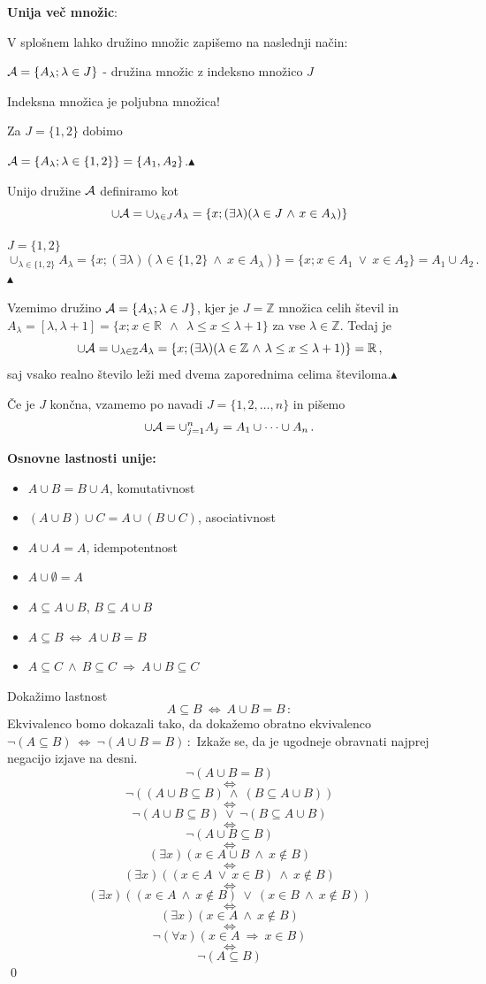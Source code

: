 \documentclass[12pt,a4paper]{article}
\def\ali {{~\vee~}}
\def\inn {{~\wedge~}}
\def\sledi {{~\Rightarrow~}}
\def\cee {{~\Leftrightarrow~}}
\def\zgled{\noindent{\bf\color{blue} Zgled: }}
\def\kz{{\hfill{\color{blue}$\blacktriangle$}}}%
\begin{document}
\medskip

{\bf Unija več množic}:

V splošnem lahko družino množic zapišemo na naslednji način:

${\cal A} = \{A_\lambda; \lambda \in J\}$ - družina množic z indeksno množico $J$

Indeksna množica je poljubna množica!

\medskip
\zgled
Za $J = \{1,2\}$ dobimo

${\cal A} = \{A_\lambda; \lambda \in \{1,2\}\} = \{A_1,A_2\}$.\kz

\medskip
Unijo družine ${\cal A}$ definiramo kot
$$\cup {\cal A} = \cup_{\lambda \in J} A_\lambda = \{x;(\exists \lambda) (\lambda \in J\inn x\in A_\lambda)\}$$

\medskip
\zgled $J = \{1,2\}$
$$\cup_{\lambda \in \{1,2\}} A_\lambda = \{x;(\exists \lambda) (\lambda \in \{1,2\}\inn x\in A_\lambda)\}= \{x;x\in A_1 \ali x\in A_2\} = A_1\cup A_2\,.$$
\kz

\medskip
\zgled
Vzemimo družino
${\cal A} = \{A_\lambda; \lambda \in J\}$, kjer je $J = \mathbb{Z}$ množica celih števil
in $A_\lambda = [\lambda,\lambda+1] = \{x; x\in \mathbb{R}~\inn~\lambda\le x\le \lambda +1\}$ za vse $\lambda\in \mathbb{Z}$.
Tedaj je
$$\cup {\cal A} = \cup_{\lambda\in \mathbb{Z}}A_\lambda
= \{x;(\exists \lambda) (\lambda \in \mathbb{Z}\inn \lambda \le x\le \lambda +1)\} = \mathbb{R}\,,$$
saj vsako realno število leži med dvema zaporednima celima številoma.\kz

\medskip
Če je $J$ končna, vzamemo po navadi $J = \{1,2,\ldots, n\}$ in pišemo
$$\cup {\cal A} = \cup_{j = 1}^nA_j = A_1\cup\cdots\cup A_n\,.$$


\bigskip
{\bf Osnovne lastnosti unije:}
\begin{itemize}
  \item $A\cup B = B\cup A$, komutativnost
  \item $(A\cup B)\cup C = A\cup (B\cup C)$, asociativnost
  \item $A\cup A = A$, idempotentnost
  \item $A\cup \emptyset = A$
  \item $A\subseteq A\cup B$, $B\subseteq A\cup B$
  \item $A\subseteq B\cee A\cup B = B$
  \item $A\subseteq C\inn B\subseteq C\sledi A\cup B \subseteq C$
\end{itemize}

\bigskip
Dokažimo lastnost
$$A\subseteq B\cee A\cup B = B\,:$$
\medskip
Ekvivalenco bomo dokazali tako, da dokažemo obratno ekvivalenco
$\neg(A\subseteq B)\cee \neg(A\cup B = B)\,:$
Izkaže se, da je ugodneje obravnati najprej negacijo izjave na desni.
$$\neg(A\cup B = B)$$
$$\cee$$
$$\neg((A\cup B \subseteq B)\inn (B \subseteq A\cup B))$$
$$\cee$$
$$\neg(A\cup B \subseteq B) \ali \neg(B \subseteq A\cup B) $$
$$\cee$$
$$\neg(A\cup B \subseteq B)$$
$$\cee$$
$$(\exists x)(x\in A\cup B\inn x\not\in B)$$
$$\cee$$
$$(\exists x)((x\in A \ali x\in B)\inn x\not\in B)$$
$$\cee$$
$$(\exists x)((x\in A \inn x\not\in B) \ali (x\in B \inn x\not\in B))$$
$$\cee$$
$$(\exists x)(x\in A \inn x\not\in B)$$
$$\cee$$
$$\neg(\forall x)(x\in A\sledi x\in B)$$
$$\cee$$
$$\neg(A\subseteq B)$$
\qed
\end{document}
